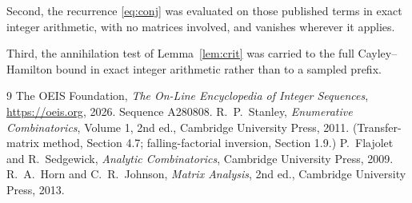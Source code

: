 \documentclass[11pt,a4paper]{article}
\theoremstyle{plain}
\theoremstyle{definition}
\begin{document}
Second, the recurrence \eqref{eq:conj} was evaluated on those published terms in exact
integer arithmetic, with no matrices involved, and vanishes wherever it applies.

Third, the annihilation test of Lemma~\ref{lem:crit} was carried to the full
Cayley--Hamilton bound in exact integer arithmetic rather than to a sampled prefix.

\begin{thebibliography}{9}
 The OEIS Foundation, \emph{The On-Line Encyclopedia of Integer
Sequences}, \url{https://oeis.org}, 2026. Sequence A280808.
 R.~P.~Stanley, \emph{Enumerative Combinatorics}, Volume 1, 2nd ed.,
Cambridge University Press, 2011. (Transfer-matrix method, Section 4.7; falling-factorial
inversion, Section 1.9.)
 P.~Flajolet and R.~Sedgewick, \emph{Analytic Combinatorics}, Cambridge
University Press, 2009.
 R.~A.~Horn and C.~R.~Johnson, \emph{Matrix Analysis}, 2nd ed., Cambridge
University Press, 2013.
\end{thebibliography}
\end{document}
